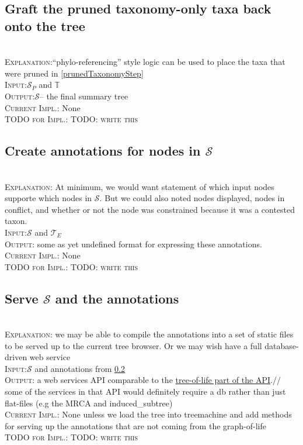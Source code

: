 \documentclass[11pt]{article}
\newcommand{\stepExplanation}[0]{\\\noindent\textsc{Explanation}:\xspace}
\newcommand{\stepInput}[0]{\\\noindent\textsc{Input}:\xspace}
\newcommand{\stepOutput}[0]{\\\noindent\textsc{Output}:\xspace}
\newcommand{\currImpl}[0]{\\\noindent\textsc{Current Impl.}:\xspace}
\newcommand{\implTODO}[0]{\\\noindent\textsc{TODO for Impl.}:\xspace}
\newcommand{\comment}[1]{{\color{red} \textsc{#1}}\xspace}
\newcommand{\TODO}[1]{\comment{TODO: #1}}
\newcommand{\taxonomy}[0]{\ensuremath{\mathbb{T}}\xspace}
\newcommand{\expandedPhylo}[0]{\ensuremath{\mathcal{T}_{E}}\xspace}
\newcommand{\prunedSummary}[0]{\ensuremath{\mathcal{S}_{P}}\xspace}
\newcommand{\summaryTree}[0]{\ensuremath{\mathcal{S}}\xspace}
\begin{document}
\subsection{Graft the pruned taxonomy-only taxa back onto the tree}
\stepExplanation ``phylo-referencing'' style logic can be used to place the
    taxa that were pruned in \ref{prunedTaxonomyStep}
\stepInput \prunedSummary and \taxonomy
\stepOutput \summaryTree -- the final summary tree
\currImpl None
\implTODO \TODO{write this}

\subsection{Create annotations for nodes in $\summaryTree$}\label{annotationsStep}
\stepExplanation At minimum, we would want statement of which
    input nodes supporte which nodes in $\summaryTree$.
    But we could also noted nodes displayed, nodes in conflict, 
    and whether or not the node was constrained because it was a contested taxon.
\stepInput \summaryTree and \expandedPhylo
\stepOutput some as yet undefined format for expressing these annotations.
\currImpl None
\implTODO \TODO{write this}

\subsection{Serve \summaryTree and the annotations}
\stepExplanation we may be able to compile the annotations into a set of
    static files to be served up to the current tree browser.
    Or we may wish have a full database-driven web service
    \stepInput \summaryTree and annotations from \ref{annotationsStep}
\stepOutput a web services API comparable to the
    \href{https://github.com/OpenTreeOfLife/opentree/wiki/Open-Tree-of-Life-APIs#tree-of-life}{tree-of-life part of the API}.//
    some of the services in that API would definitely require a db rather than just flat-files (e.g the MRCA and induced\_subtree)
\currImpl None unless we load the tree into treemachine and add methods for
    serving up the annotations that are not coming from the graph-of-life
\implTODO \TODO{write this}


\newpage
\end{document}
